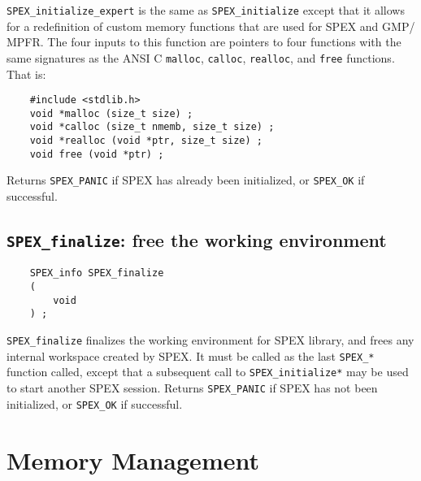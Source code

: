 \documentclass[12pt]{report}
\theoremstyle{definition}
\begin{document}
\verb|SPEX_initialize_expert| is the same as \verb|SPEX_initialize| except that
it allows for a redefinition of custom memory functions that are used for SPEX
and GMP/ MPFR.  The four inputs to this function are pointers to four
functions with the same signatures as the ANSI C \verb'malloc', \verb'calloc',
\verb'realloc', and \verb'free' functions.  That is:

\begin{mdframed}[userdefinedwidth=6in]
{\footnotesize
\begin{verbatim}
    #include <stdlib.h>
    void *malloc (size_t size) ;
    void *calloc (size_t nmemb, size_t size) ;
    void *realloc (void *ptr, size_t size) ;
    void free (void *ptr) ;
\end{verbatim}
} \end{mdframed}

Returns \verb|SPEX_PANIC| if SPEX has already been initialized,
or \verb|SPEX_OK| if successful.

\newpage
\cprotect\subsection{\verb|SPEX_finalize|: free the working environment}
\label{ss:SPEX_finalize}

\begin{mdframed}[userdefinedwidth=6in]
{\footnotesize
\begin{verbatim}
    SPEX_info SPEX_finalize
    (
        void
    ) ;
\end{verbatim}
} \end{mdframed}

\verb|SPEX_finalize| finalizes the working environment for SPEX
library, and frees any internal workspace created by SPEX.  It must be
called as the last \verb|SPEX_*| function called, except that a subsequent
call to \verb|SPEX_initialize*| may be used to start another SPEX session.
Returns \verb|SPEX_PANIC| if SPEX has not been initialized,
or \verb|SPEX_OK| if successful.

\section{Memory Management} \label{s:user:memmanag}
\end{document}
